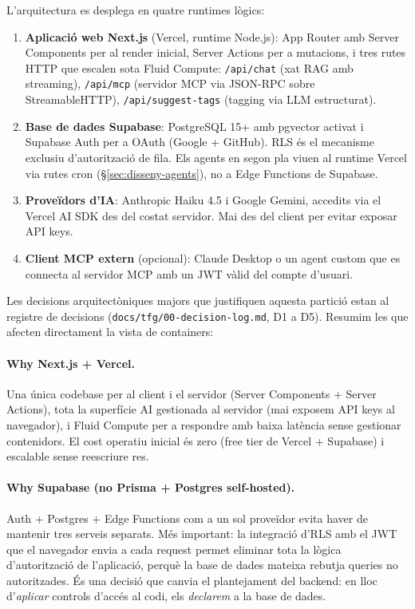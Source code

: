 L'arquitectura es desplega en quatre runtimes lògics:

\begin{enumerate}
    \item \textbf{Aplicació web Next.js} (Vercel, runtime Node.js): App Router amb Server Components per al render inicial, Server Actions per a mutacions, i tres rutes HTTP que escalen sota Fluid Compute: \texttt{/api/chat} (xat RAG amb streaming), \texttt{/api/mcp} (servidor MCP via JSON-RPC sobre StreamableHTTP), \texttt{/api/suggest-tags} (tagging via LLM estructurat).
    \item \textbf{Base de dades Supabase}: PostgreSQL 15+ amb pgvector activat i Supabase Auth per a OAuth (Google + GitHub). RLS és el mecanisme exclusiu d'autorització de fila. Els agents en segon pla viuen al runtime Vercel via rutes cron (\S\ref{sec:disseny-agents}), no a Edge Functions de Supabase.
    \item \textbf{Proveïdors d'IA}: Anthropic Haiku 4.5 i Google Gemini, accedits via el Vercel AI SDK des del costat servidor. Mai des del client per evitar exposar API keys.
    \item \textbf{Client MCP extern} (opcional): Claude Desktop o un agent custom que es connecta al servidor MCP amb un JWT vàlid del compte d'usuari.
\end{enumerate}

Les decisions arquitectòniques majors que justifiquen aquesta partició estan al registre de decisions (\texttt{docs/tfg/00-decision-log.md}, D1 a D5). Resumim les que afecten directament la vista de containers:

\paragraph{Why Next.js + Vercel.} Una única codebase per al client i el servidor (Server Components + Server Actions), tota la superfície AI gestionada al servidor (mai exposem API keys al navegador), i Fluid Compute per a respondre amb baixa latència sense gestionar contenidors. El cost operatiu inicial és zero (free tier de Vercel + Supabase) i escalable sense reescriure res.

\paragraph{Why Supabase (no Prisma + Postgres self-hosted).} Auth + Postgres + Edge Functions com a un sol proveïdor evita haver de mantenir tres serveis separats. Més important: la integració d'RLS amb el JWT que el navegador envia a cada request permet eliminar tota la lògica d'autorització de l'aplicació, perquè la base de dades mateixa rebutja queries no autoritzades. És una decisió que canvia el plantejament del backend: en lloc d'\emph{aplicar} controls d'accés al codi, els \emph{declarem} a la base de dades.

